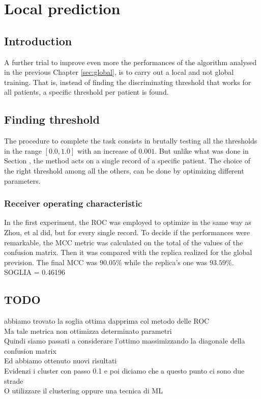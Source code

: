 \chapter{Local prediction}
\label{sec:local}

\section{Introduction}
A further trial to improve even more the performances of the algorithm analysed in the previous Chapter \ref{sec:global}, is to carry out a local and not global training. That is, instead of finding the discriminating threshold that works for all patients, a specific threshold per patient is found. 

\section{Finding threshold}
The procedure to complete the task consists in brutally testing all the thresholds in the range $[0.0,1.0]$ with an increase of $0.001$. But unlike what was done in Section \label{sec:entropy}, the method acts on a single record of a specific patient. The choice of the right threshold among all the others, can be done by optimizing different parameters.
\subsection{Receiver operating characteristic}
In the first experiment, the ROC was employed to optimize in the same way as Zhou, et al\cite{zhou2015} did, but for every single record. To decide if the performances were remarkable, the MCC metric was calculated on the total of the values of the confusion matrix. Then it was compared with the replica realized for the global prevision. The final MCC was $90.05\%$ while the replica's one was $93.59\%$. SOGLIA = 0.46196

\lipsum[4]

\section{TODO}
abbiamo trovato la soglia ottima dapprima col metodo delle ROC\\
Ma tale metrica non ottimizza determinato parametri\\
Quindi siamo passati a considerare l'ottimo massimizzando la diagonale della confusion matrix\\
Ed abbiamo ottenuto nuovi risultati\\
Evidenzi i cluster con passo 0.1 e poi diciamo che a questo punto ci sono due strade\\
O utilizzare il clustering oppure una tecnica di ML